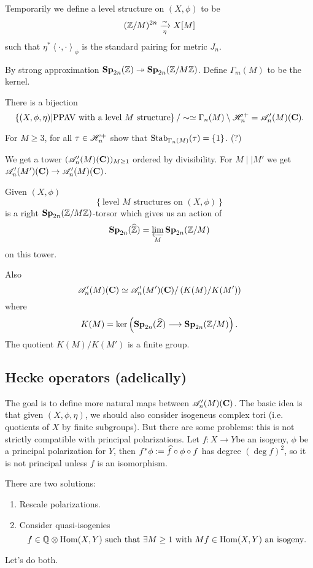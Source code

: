 \begin{definition}
	Temporarily we define a level structure on $(X,\phi)$ to be
	\[
		(\mathbb Z /M)^{2n} \xrightarrow[\eta]{\sim} X[M]
	\] 
	such that $\eta^{*}\left<\cdot ,\cdot  \right>_\phi$ is the standard pairing for metric $J_n$.
\end{definition}
\begin{fact}
	By strong approximation $\mathbf{Sp}_{2n}(\mathbb Z)\twoheadrightarrow \mathbf{Sp}_{2n}(\mathbb Z /M\mathbb Z)$. Define $\Gamma_m(M)$ to be the kernel.
\end{fact}
\begin{corollary}
	There is a bijection
	\[
		\left\{ (X,\phi,\eta) \middle| \text{PPAV with a level }M\text{ structure} \right\} / \sim \simeq \Gamma_n(M) \setminus \mathscr H_n^{+} = \mathscr{A}_n'(M)(\mathbf{C}).
	\] 
\end{corollary}
\begin{exercise}
	For $M\ge 3$, for all $\tau\in \mathscr H_n^{+}$ show that $\operatorname{Stab}_{\Gamma_n(M)}(\tau) = \{1\}$. (?)
\end{exercise}
We get a tower $(\mathscr{A}'_n(M)(\mathbf{C}))_{M\ge 1}$ ordered by divisibility. For $M \mid |M'$ we get $\CA_n'(M')(\C)\to \CA_n'(M)(\C)$.

Given $(X,\phi)$ 
\[
\left\{ \text{level }M\text{ structures on }(X,\phi) \right\} 
\] 
is a right $\mathbf{Sp}_{2n}(\mathbb Z /M\mathbb Z)$-torsor which gives us an action of
\[
	\mathbf{Sp}_{2n}(\widehat{\mathbb Z}) = \varprojlim_M \mathbf{Sp}_{2n}(\mathbb Z /M)
\] 
on this tower.

Also
\[
	\mathscr{A}_n'(M)(\mathbf{C}) \simeq \mathscr{A}'_n(M')(\mathbf{C}) /\left( K(M) /K(M') \right) 
\] 
where 
\[
	K(M) = \ker\left( \Sp_{2n}(\wh{Z}) \to \Sp_{2n}(\Z /M) \right) .
\] 
The quotient $K(M) /K(M')$ is a finite group.

\subsection{Hecke operators (adelically)}
The goal is to define more natural maps between $\mathscr{A}_n'(M)(\mathbf{C})$. The basic idea is that given $(X,\phi,\eta)$, we should also consider isogeneus complex tori (i.e. quotients of $X$ by finite subgroups). But there are some problems: this is not strictly compatible with principal polarizations. Let $f:X\to Y$be an isogeny, $\phi$ be a principal polarization for $Y$, then $f^{*}\phi:= \widehat{f}\circ \phi \circ f$ has degree $(\deg f)^2$, so it is not principal unless $f$ is an isomorphism.

There are two solutions:
\begin{enumerate}[1)]
	\item Rescale polarizations.
	\item Consider quasi-isogenies 
		\[
			f\in \mathbb Q\otimes\operatorname{Hom}(X,Y) \text{ such that }\exists M\ge 1 \text{ with } Mf\in \operatorname{Hom}(X,Y) \text{ an isogeny}.
		\]
\end{enumerate}
Let's do both.


